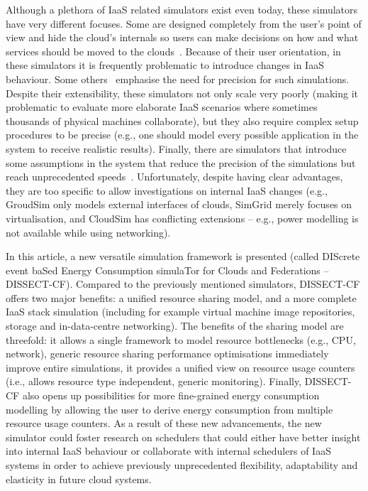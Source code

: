 \documentclass[sort, compress, 5p]{elsarticle}
\begin{document}
Although a plethora of IaaS related simulators exist even today, these simulators have very different focuses. Some are designed completely from the user's point of view and hide the cloud's internals so users can make decisions on how and what services should be moved to the clouds~\cite{SimGrid-Hirofuchi2013, iCanCloud-Nunez2011}. Because of their user orientation, in these simulators it is frequently problematic to introduce changes in IaaS behaviour. Some others~\cite{DCWorms-kurowski2013dcworms, GreenCloud-5683561} emphasise the need for precision for such simulations. Despite their extensibility, these simulators not only scale very poorly (making it problematic to evaluate more elaborate IaaS scenarios where sometimes thousands of physical machines collaborate), but they also require complex setup procedures to be precise (e.g., one should model every possible application in the system to receive realistic results). Finally, there are simulators that introduce some assumptions in the system that reduce the precision of the simulations but reach unprecedented speeds~\cite{CloudSim-calheiros2011CloudSim, SimGrid-Hirofuchi2013, GroudSim-ostermann2011groudsim}. Unfortunately, despite having clear advantages, they are  too specific to allow investigations on internal IaaS changes (e.g., GroudSim only models external interfaces of clouds, SimGrid merely focuses on virtualisation, and CloudSim has conflicting extensions -- e.g., power modelling is not available while using networking).

In this article, a new versatile simulation framework is presented (called DIScrete event baSed Energy Consumption simulaTor for Clouds and Federations -- DISSECT-CF). Compared to the previously mentioned simulators, DISSECT-CF offers two major benefits: a unified resource sharing model, and a more complete IaaS stack simulation (including for example virtual machine image repositories, storage and in-data-centre networking). The benefits of the sharing model are threefold:  it allows a single framework to model resource bottlenecks (e.g., CPU, network),  generic resource sharing performance optimisations immediately improve entire simulations,  it provides a unified view on resource usage counters (i.e., allows resource type independent, generic monitoring). Finally, DISSECT-CF also opens up possibilities for more fine-grained energy consumption modelling by allowing the user to derive energy consumption from multiple resource usage counters. As a result of these new advancements, the new simulator could foster research on schedulers that could either have better insight into internal IaaS behaviour or collaborate with internal schedulers of IaaS systems in order to achieve previously unprecedented flexibility, adaptability and elasticity in future cloud systems.
\end{document}
